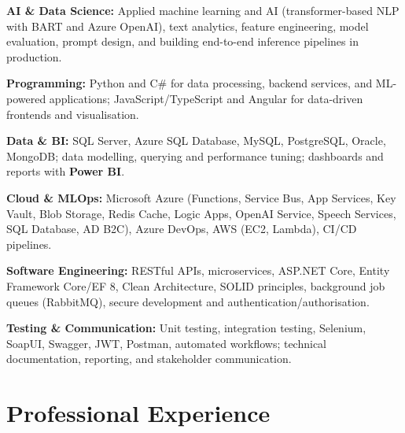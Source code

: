 \documentclass[letterpaper,10pt]{article}
\newenvironment{resume_list}{
  \vspace{-7pt}
  \begin{itemize}[itemsep=-2px, parsep=1pt, leftmargin=30pt]
}{
  \end{itemize}
}
\begin{document}
\begin{resume_list}
    \item \textbf{AI \& Data Science:} Applied machine learning and AI (transformer-based NLP with BART and Azure OpenAI), text analytics, feature engineering, model evaluation, prompt design, and building end-to-end inference pipelines in production.
    \item \textbf{Programming:} Python and C\# for data processing, backend services, and ML-powered applications; JavaScript/TypeScript and Angular for data-driven frontends and visualisation.
    \item \textbf{Data \& BI:} SQL Server, Azure SQL Database, MySQL, PostgreSQL, Oracle, MongoDB; data modelling, querying and performance tuning; dashboards and reports with \textbf{Power BI}.
    \item \textbf{Cloud \& MLOps:} Microsoft Azure (Functions, Service Bus, App Services, Key Vault, Blob Storage, Redis Cache, Logic Apps, OpenAI Service, Speech Services, SQL Database, AD B2C), Azure DevOps, AWS (EC2, Lambda), CI/CD pipelines.
    \item \textbf{Software Engineering:} RESTful APIs, microservices, ASP.NET Core, Entity Framework Core/EF 8, Clean Architecture, SOLID principles, background job queues (RabbitMQ), secure development and authentication/authorisation.
    \item \textbf{Testing \& Communication:} Unit testing, integration testing, Selenium, SoapUI, Swagger, JWT, Postman, automated workflows; technical documentation, reporting, and stakeholder communication.
\end{resume_list}

\section{Professional Experience}
\end{document}
